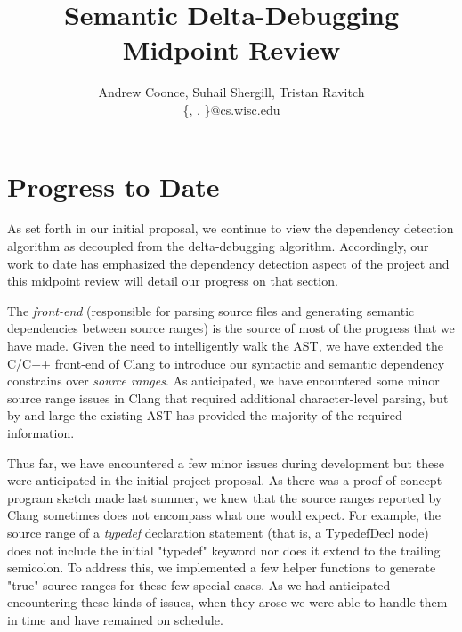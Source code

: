 \documentclass[11pt]{article}
\title{Semantic Delta-Debugging\\
Midpoint Review}
\author{Andrew Coonce, Suhail Shergill, Tristan Ravitch \\
\{\mailto{coonce}, \mailto{shergill}, \mailto{travitch}\}@cs.wisc.edu
}
\begin{document}
\maketitle

\section{Progress to Date}
As set forth in our initial proposal, we continue to view the dependency
detection algorithm as decoupled from the delta-debugging
algorithm. Accordingly, our work to date has emphasized the dependency detection
aspect of the project and this midpoint review will detail our progress on that
section.

The \emph{front-end} (responsible for parsing source files and generating
semantic dependencies between source ranges) is the source of most of the
progress that we have made. Given the need to intelligently walk the AST, we
have extended the C/C++ front-end of Clang to introduce our syntactic and
semantic dependency constrains over \emph{source ranges}. As anticipated, we
have encountered some minor source range issues in Clang that required
additional character-level parsing, but by-and-large the existing AST has
provided the majority of the required information.

Thus far, we have encountered a few minor issues during development but these were
anticipated in the initial project proposal. As there was a proof-of-concept
program sketch made last summer, we knew that the source ranges reported by
Clang \citep{clang} sometimes does not encompass what one would expect. For
example, the source range of a \emph{typedef} declaration statement (that is, a
TypedefDecl node) does not include the initial "typedef" keyword nor does it
extend to the trailing semicolon. To address this, we implemented a few helper
functions to generate "true" source ranges for these few special cases. As we
had anticipated encountering these kinds of issues, when they arose we were able
to handle them in time and have remained on schedule.
\end{document}
